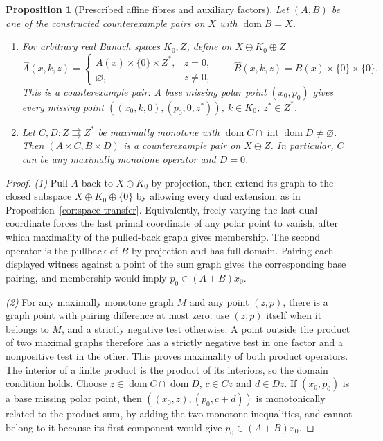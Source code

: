 \documentclass[11pt]{article}
\newcommand{\dom}{\operatorname{dom}}
\newtheorem{proposition}{Proposition}
\theoremstyle{definition}
\theoremstyle{remark}
\begin{document}
\begin{proposition}[Prescribed affine fibres and auxiliary factors]
\label{cor:product-fibres}
Let $(A,B)$ be one of the constructed counterexample pairs on $X$ with $\dom B=X$.
\begin{enumerate}
\item For arbitrary real Banach spaces $K_0,Z$, define on $X\oplus K_0\oplus Z$
\[
\widehat A(x,k,z)=
\begin{cases}A(x)\times\{0\}\times Z^*,&z=0,\\\varnothing,&z\ne0,\end{cases}
\qquad
\widehat B(x,k,z)=B(x)\times\{0\}\times\{0\}.
\]
This is a counterexample pair. A base missing polar point $(x_0,p_0)$ gives every missing point $((x_0,k,0),(p_0,0,z^*))$, $k\in K_0$, $z^*\in Z^*$.
\item Let $C,D:Z\rightrightarrows Z^*$ be maximally monotone with $\dom C\cap\operatorname{int}\dom D\ne\varnothing$. Then $(A\times C,B\times D)$ is a counterexample pair on $X\oplus Z$. In particular, $C$ can be any maximally monotone operator and $D=0$.
\end{enumerate}
\end{proposition}
\begin{proof}
\noindent\textit{(1)} Pull $A$ back to $X\oplus K_0$ by projection, then extend its graph to the closed subspace $X\oplus K_0\oplus\{0\}$ by allowing every dual extension, as in Proposition~\ref{cor:space-transfer}. Equivalently, freely varying the last dual coordinate forces the last primal coordinate of any polar point to vanish, after which maximality of the pulled-back graph gives membership. The second operator is the pullback of $B$ by projection and has full domain. Pairing each displayed witness against a point of the sum graph gives the corresponding base pairing, and membership would imply $p_0\in(A+B)x_0$.

\noindent\textit{(2)} For any maximally monotone graph $M$ and any point $(z,p)$, there is a graph point with pairing difference at most zero: use $(z,p)$ itself when it belongs to $M$, and a strictly negative test otherwise. A point outside the product of two maximal graphs therefore has a strictly negative test in one factor and a nonpositive test in the other. This proves maximality of both product operators. The interior of a finite product is the product of its interiors, so the domain condition holds. Choose $z\in\dom C\cap\dom D$, $c\in Cz$ and $d\in Dz$. If $(x_0,p_0)$ is a base missing polar point, then $((x_0,z),(p_0,c+d))$ is monotonically related to the product sum, by adding the two monotone inequalities, and cannot belong to it because its first component would give $p_0\in(A+B)x_0$.
\end{proof}
\end{document}
